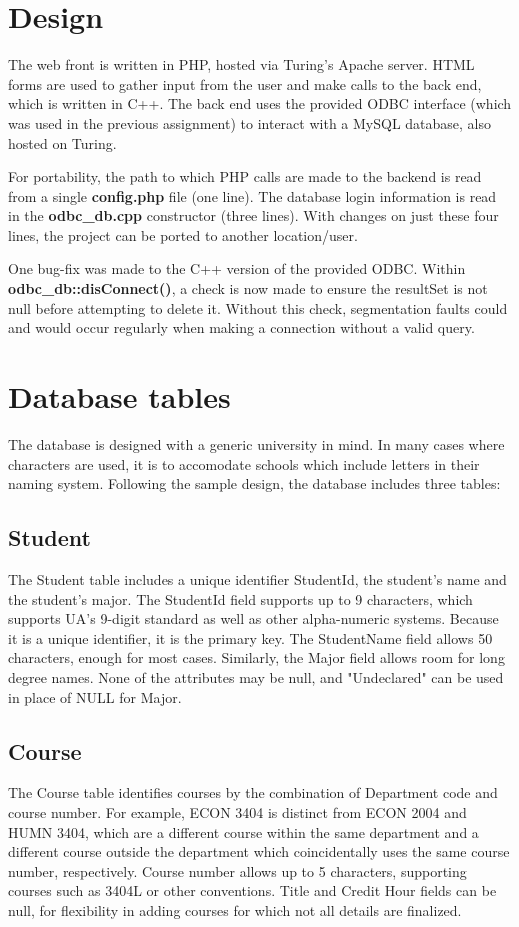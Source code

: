 \documentclass{article}      %
\begin{document}
\section*{Design}
The web front is written in PHP, hosted via Turing's Apache server.
HTML forms are used to gather input from the user and make calls to the back end,
which is written in C++.
The back end uses the provided ODBC interface (which was used in the previous assignment)
to interact with a MySQL database, also hosted on Turing.

For portability, the path to which PHP calls are made to the backend is read from a single
\textbf{config.php} file (one line).
The database login information is read in the \textbf{odbc\_db.cpp} constructor (three lines).
With changes on just these four lines, the project can be ported to another location/user.

One bug-fix was made to the C++ version of the provided ODBC.
Within \textbf{odbc\_db::disConnect()}, a check is now made to ensure the resultSet
is not null before attempting to delete it.
Without this check, segmentation faults could and would occur regularly when making a 
connection without a valid query.

\section*{Database tables}
The database is designed with a generic university in mind.
In many cases where characters are used, it is to accomodate schools which
include letters in their naming system.
Following the sample design, the database includes three tables:
\subsection{Student}
The Student table includes a unique identifier StudentId,
the student's name and the student's major.
The StudentId field supports up to 9 characters, which supports UA's 9-digit standard
as well as other alpha-numeric systems.
Because it is a unique identifier, it is the primary key.
The StudentName field allows 50 characters, enough for most cases.
Similarly, the Major field allows room for long degree names.
None of the attributes may be null, and "Undeclared" can be used in place of NULL for Major.
\subsection{Course}
The Course table identifies courses by the combination of Department code and course number.
For example, ECON 3404 is distinct from ECON 2004 and HUMN 3404,
which are a different course within the same department and a different course outside the
department which coincidentally uses the same course number, respectively.
Course number allows up to 5 characters, supporting courses such as 3404L or other conventions.
Title and Credit Hour fields can be null, for flexibility in adding courses for which
not all details are finalized.
\end{document}
